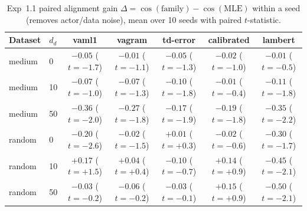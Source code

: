 \begin{table}[htbp]
\centering
\caption{Exp~1.1 paired alignment gain $\Delta = \cos(\text{family}) - \cos(\text{MLE})$ within a seed (removes actor/data noise), mean over 10 seeds with paired $t$-statistic.}
\label{tab:h11paired}
\begin{tabular}{llccccc}
\toprule
Dataset & $d_d$ & vaml1 & vagram & td-error & calibrated & lambert \\
\midrule
medium & 0 & $-0.05$ ($t=-1.7$) & $-0.01$ ($t=-1.1$) & $-0.05$ ($t=-1.3$) & $-0.02$ ($t=-1.0$) & $-0.01$ ($t=-0.5$) \\
medium & 10 & $-0.07$ ($t=-1.0$) & $-0.07$ ($t=-1.3$) & $-0.10$ ($t=-1.8$) & $-0.01$ ($t=-0.4$) & $-0.11$ ($t=-1.8$) \\
medium & 50 & $-0.36$ ($t=-2.0$) & $-0.27$ ($t=-1.8$) & $-0.17$ ($t=-1.9$) & $-0.19$ ($t=-1.8$) & $-0.35$ ($t=-2.2$) \\
random & 0 & $-0.20$ ($t=-2.6$) & $-0.02$ ($t=-1.5$) & $+0.01$ ($t=+0.3$) & $-0.02$ ($t=-0.6$) & $-0.30$ ($t=-1.7$) \\
random & 10 & $+0.17$ ($t=+1.5$) & $+0.04$ ($t=+0.4$) & $-0.10$ ($t=-0.7$) & $+0.14$ ($t=+0.9$) & $-0.45$ ($t=-2.1$) \\
random & 50 & $-0.03$ ($t=-0.2$) & $-0.06$ ($t=-0.2$) & $-0.03$ ($t=-0.1$) & $+0.15$ ($t=+0.9$) & $-0.50$ ($t=-2.1$) \\
\bottomrule
\end{tabular}
\end{table}
